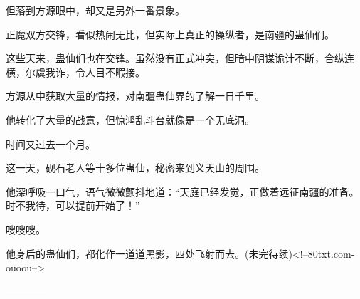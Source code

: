 \begin{this_body}
但落到方源眼中，却又是另外一番景象。

正魔双方交锋，看似热闹无比，但实际上真正的操纵者，是南疆的蛊仙们。

这些天来，蛊仙们也在交锋。虽然没有正式冲突，但暗中阴谋诡计不断，合纵连横，尔虞我诈，令人目不暇接。

方源从中获取大量的情报，对南疆蛊仙界的了解一日千里。

他转化了大量的战意，但惊鸿乱斗台就像是一个无底洞。

时间又过去一个月。

这一天，砚石老人等十多位蛊仙，秘密来到义天山的周围。

他深呼吸一口气，语气微微颤抖地道：“天庭已经发觉，正做着远征南疆的准备。时不我待，可以提前开始了！”

嗖嗖嗖。

他身后的蛊仙们，都化作一道道黑影，四处飞射而去。(未完待续)<!--80txt.com-ouoou-->

------------

\end{this_body}

